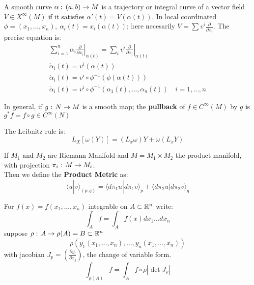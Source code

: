 \documentclass{beamer}
\begin{document}
\begin{frame}
\end{frame}
\begin{frame}
\begin{ddef}
    A smooth curve $\alpha:\, (a,b) \to M $ is a trajectory or integral curve of a vector field $V\in X^\infty (M)$ if it satisfies $\alpha ' (t) = V(\alpha(t))$. 
    In local coordinated $\phi=(x_1,\ldots, x_n),\ \alpha_i(t) = x_i(\alpha(t))$; here necesarily $V=\sum v^i\frac{\partial}{\partial x_i}$. The precise equation is:
    \begin{gather*} 
    \sum_{i=1}^n \dot \alpha_i \left. \frac{\partial}{\partial x_i} \right|_{\alpha(t)} = \sum_i v^i \left. \frac{\partial}{\partial x_i} \right|_{\alpha(t)}\\
    \dot \alpha_i(t) = v^i(\alpha(t))\\
    \dot \alpha_i(t) = v^i\circ \phi^{-1}(\phi(\alpha(t)))\\
    \dot \alpha_i(t) = v^i\circ \phi^{-1}(\alpha_1(t), \ldots , \alpha_n(t)) \quad i=1,\ldots, n
\end{gather*}
\end{ddef}
\begin{ddef}
    In general, if $g:\, N\to M$ is a smooth map; the \textbf{pullback} of $f\in C^\infty(M)$ by $g$ is $g^*f=f\circ g\in C^\infty(N)$ 
\end{ddef}
\end{frame}
\begin{frame}
\begin{ddef}
The Leibnitz rule is:
$$L_X[\omega(Y)] = (L_x\omega) Y + \omega(L_xY)$$
\end{ddef}
\end{frame}
\begin{frame}
\begin{ddef}
If $M_1$ and $M_2$ are Riemann Manifold and $M=M_1\times M_2$ the product manifold, with projection $\pi_i :\, M\to M_i$.\\
Then we define the \textbf{Product Metric} as:
$$\langle u | v \rangle _{(p,q)} = \langle d\pi_1 u | d\pi_1 v\rangle_p + \langle d\pi_2 u | d\pi_2 v \rangle_q$$
\end{ddef}
\begin{ddef}[Volume of $(M,g)$]
For $f(x) = f(x_1,\ldots ,x_n) $ integrable on $A\subset \mathbb{R}^n$ write:
$$\int_A f= \int_Af(x) dx_1 \ldots dx_n$$
suppose $\rho:\, A\to \rho(A) = B\subset \mathbb{R}^n$ 
$$\rho(y_1(x_1,\ldots,x_n), \ldots, y_n(x_1,\ldots, x_n))$$
 with jacobian $J_p = \left( \frac{\partial y_i}{\partial  x_j} \right)$, the change of variable form.
$$\int_{\rho(A)} f = \int_A f\circ \rho |\det J_\rho |$$
\end{ddef}
\end{frame}
\end{document}
